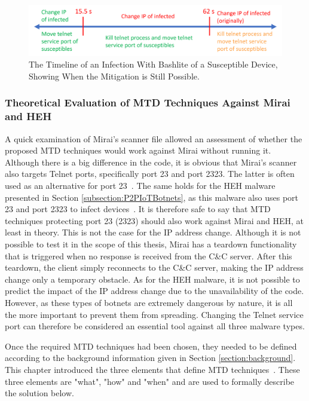 \begin{figure}[tph]
\includegraphics[scale=0.7]{assets/timeline.png}
\centering
\caption{The Timeline of an Infection With Bashlite of a Susceptible Device, Showing When the Mitigation is Still Possible.}
    \label{graphic:timeline}
\end{figure}

\subsubsection{Theoretical Evaluation of MTD Techniques Against Mirai and HEH}
A quick examination of Mirai's scanner file allowed an assessment of whether the proposed MTD techniques would work against Mirai without running it. Although there is a big difference in the code, it is obvious that Mirai's scanner also targets Telnet ports, specifically port 23 and port 2323. The latter is often used as an alternative for port 23~\cite{website:gitSpeedGuide}. The same holds for the HEH malware presented in Section \ref{subsection:P2PIoTBotnets}, as this malware also uses port 23 and port 2323 to infect devices~\cite{website:trendMicroUncleanable}. It is therefore safe to say that MTD techniques protecting port 23 (2323) should also work against Mirai and HEH, at least in theory. This is not the case for the IP address change. Although it is not possible to test it in the scope of this thesis, Mirai has a teardown functionality that is triggered when no response is received from the C\&C server. After this teardown, the client simply reconnects to the C\&C server, making the IP address change only a temporary obstacle. As for the HEH malware, it is not possible to predict the impact of the IP address change due to the unavailability of the code. However, as these types of botnets are extremely dangerous by nature, it is all the more important to prevent them from spreading. Changing the Telnet service port can therefore be considered an essential tool against all three malware types.

Once the required MTD techniques had been chosen, they needed to be defined according to the background information given in Section \ref{section:background}. This chapter introduced the three elements that define MTD techniques~\cite{article:Cai}. These three elements are "what", "how" and "when" and are used to formally describe the solution below. 

